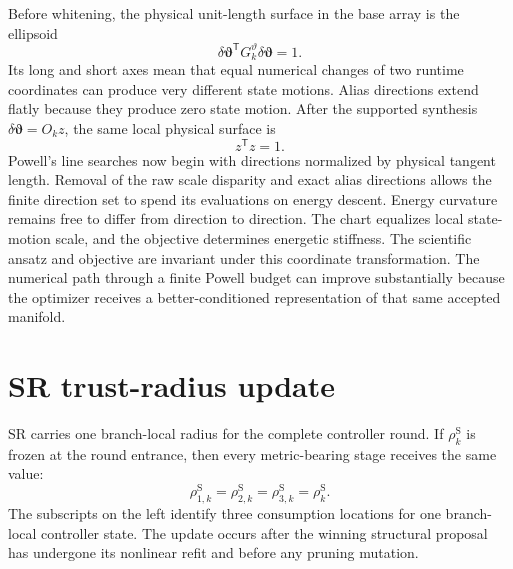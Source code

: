 \documentclass[10pt,twocolumn]{article}
\begin{document}
Before whitening, the physical unit-length surface in the base array is the
ellipsoid
\begin{equation}
\delta\bm\vartheta^{\mathsf T}
G_k^{\vartheta}\delta\bm\vartheta=1.
\label{eq:sr-refit-base-ellipsoid}
\end{equation}
Its long and short axes mean that equal numerical changes of two runtime
coordinates can produce very different state motions. Alias directions extend
flatly because they produce zero state motion. After the supported synthesis
\(\delta\bm\vartheta=O_kz\), the same local physical surface is
\begin{equation}
z^{\mathsf T}z=1.
\label{eq:sr-refit-whitened-sphere}
\end{equation}
Powell's line searches now begin with directions normalized by physical
tangent length. Removal of the raw scale disparity and exact alias directions
allows the finite direction set to spend its evaluations on energy descent.
Energy curvature remains free to differ from direction to direction. The chart
equalizes local state-motion scale, and the objective determines energetic
stiffness. The scientific ansatz and objective are invariant under this
coordinate transformation. The numerical
path through a finite Powell budget can improve substantially because the
optimizer receives a better-conditioned representation of that same accepted
manifold.

\section*{SR trust-radius update}

SR carries one branch-local radius for the complete controller round. If
\(\rho_k^{\mathrm S}\) is frozen at the round entrance, then every
metric-bearing stage receives the same value:
\begin{equation}
\rho_{1,k}^{\mathrm S}
=\rho_{2,k}^{\mathrm S}
=\rho_{3,k}^{\mathrm S}
=\rho_k^{\mathrm S}.
\label{eq:sr-one-radius}
\end{equation}
The subscripts on the left identify three consumption locations for one
branch-local controller state. The update occurs after the winning structural
proposal has undergone its nonlinear refit and before any pruning mutation.
\end{document}
